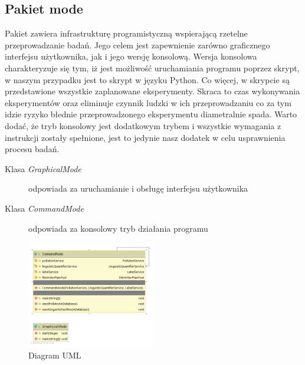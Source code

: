 \documentclass{classrep}
\begin{document}
{        \subsection{Pakiet mode} {
            Pakiet zawiera infrastrukturę programistyczną wspierającą rzetelne przeprowadzanie badań.
            Jego celem jest zapewnienie zarówno graficznego interfejsu użytkownika, jak i jego wersję
            konsolową. Wersja konsolowa charakteryzuje się tym, iż jest możliwość uruchamiania
            programu poprzez skrypt, w naszym przypadku jest to skrypt w języku Python. Co więcej,
            w skrypcie są przedstawione wszystkie zaplanowane eksperymenty. Skraca to czas wykonywania
            eksperymentów oraz eliminuje czynnik ludzki w ich przeprowadzaniu co za tym idzie ryzyko
            błednie przeprowadzonego eksperymentu diametralnie spada. Warto dodać, że tryb konsolowy
            jest dodatkowym trybem i wszystkie wymagania z instrukcji zostały spełnione, jest to
            jedynie nasz dodatek w celu usprawnienia procesu badań.

            \begin{description}
                \item[Klasa \emph{GraphicalMode}] odpowiada za uruchamianie i obsługę interfejsu użytkownika
                \item[Klasa \emph{CommandMode}] odpowiada za konsolowy tryb działania programu
            \end{description}
            \begin{figure}[!htbp]
                \centering
                \includegraphics[width=0.5\textwidth]{img/uml/mode.png}
                \caption{Diagram UML}
            \end{figure}
            \FloatBarrier
        }
    }
    \newpage
\end{document}
